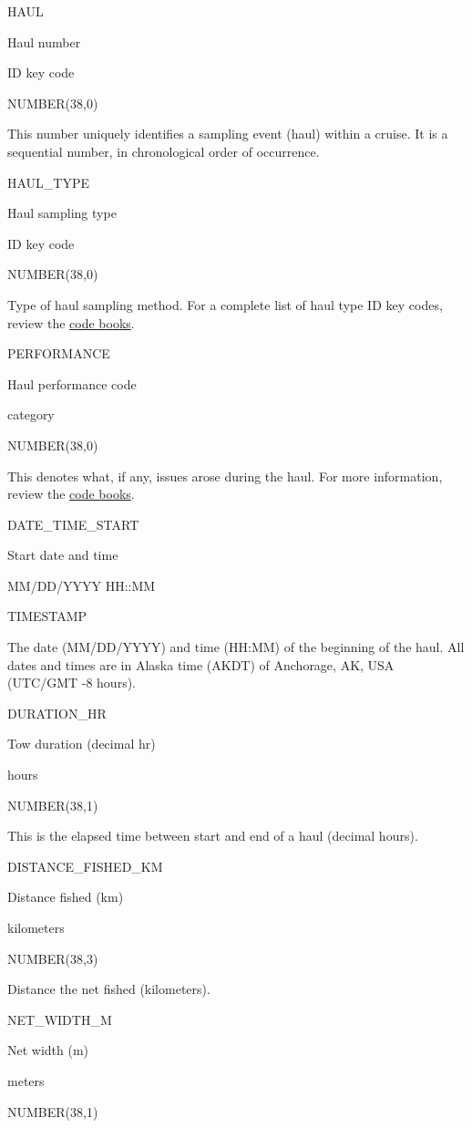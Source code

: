\documentclass[
  letterpaper,
  oneside,
  open=any]{scrbook}
\begin{document}
HAUL

Haul number

ID key code

NUMBER(38,0)

This number uniquely identifies a sampling event (haul) within a cruise.
It is a sequential number, in chronological order of occurrence.

HAUL\_TYPE

Haul sampling type

ID key code

NUMBER(38,0)

Type of haul sampling method. For a complete list of haul type ID key
codes, review the
\href{https://www.fisheries.noaa.gov/resource/document/groundfish-survey-species-code-manual-and-data-codes-manual}{code
books}.

PERFORMANCE

Haul performance code

category

NUMBER(38,0)

This denotes what, if any, issues arose during the haul. For more
information, review the
\href{https://www.fisheries.noaa.gov/resource/document/groundfish-survey-species-code-manual-and-data-codes-manual}{code
books}.

DATE\_TIME\_START

Start date and time

MM/DD/YYYY HH::MM

TIMESTAMP

The date (MM/DD/YYYY) and time (HH:MM) of the beginning of the haul. All
dates and times are in Alaska time (AKDT) of Anchorage, AK, USA (UTC/GMT
-8 hours).

DURATION\_HR

Tow duration (decimal hr)

hours

NUMBER(38,1)

This is the elapsed time between start and end of a haul (decimal
hours).

DISTANCE\_FISHED\_KM

Distance fished (km)

kilometers

NUMBER(38,3)

Distance the net fished (kilometers).

NET\_WIDTH\_M

Net width (m)

meters

NUMBER(38,1)
\end{document}
